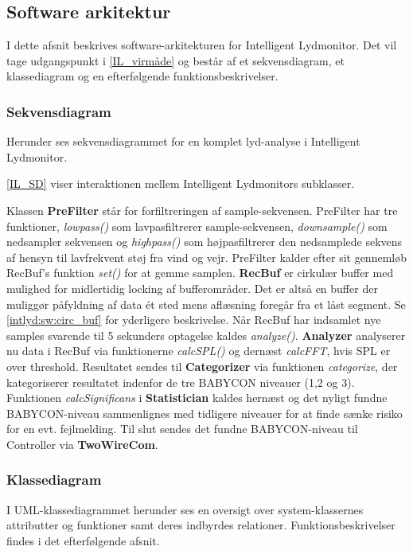 \newpage
\subsection{Software arkitektur}
I dette afsnit beskrives software-arkitekturen for Intelligent Lydmonitor. Det vil tage udgangspunkt i \ref{IL_virmåde} og består af et sekvensdiagram, et klassediagram og en efterfølgende funktionsbeskrivelser.

\subsubsection*{Sekvensdiagram}
Herunder ses sekvensdiagrammet for en komplet lyd-analyse i Intelligent Lydmonitor.

\ref{IL_SD} viser interaktionen mellem Intelligent Lydmonitors subklasser.

Klassen \textbf{PreFilter} står for forfiltreringen af sample-sekvensen. PreFilter har tre funktioner, \textit{lowpass()} som lavpasfiltrerer sample-sekvensen, \textit{downsample()} som nedsampler sekvensen og \textit{highpass()} som højpasfiltrerer den nedsamplede sekvens af hensyn til lavfrekvent støj fra vind og vejr. PreFilter kalder efter sit gennemløb RecBuf's funktion \textit{set()} for at gemme samplen.
\textbf{RecBuf} er cirkulær buffer med mulighed for midlertidig locking af bufferområder. Det er altså en buffer der muliggør påfyldning af data ét sted mens aflæsning foregår fra et låst segment. Se \ref{intlyd:sw:circ_buf} for yderligere beskrivelse. Når RecBuf har indsamlet nye samples svarende til 5 sekunders optagelse kaldes \textit{analyze()}. \textbf{Analyzer} analyserer nu data i RecBuf via funktionerne \textit{calcSPL()} og dernæst \textit{calcFFT}, hvis SPL er over threshold. Resultatet sendes til \textbf{Categorizer} via funktionen \textit{categorize}, der kategoriserer resultatet indenfor de tre BABYCON niveauer (1,2 og 3). Funktionen \textit{calcSignificans} i \textbf{Statistician} kaldes hernæst og det nyligt fundne BABYCON-niveau sammenlignes med tidligere niveauer for at finde sænke risiko for en evt. fejlmelding. Til slut sendes det fundne BABYCON-niveau til Controller via \textbf{TwoWireCom}. 

\subsubsection*{Klassediagram}
I UML-klassediagrammet herunder ses en oversigt over system-klassernes attributter og funktioner samt deres indbyrdes relationer. 
Funktionsbeskrivelser findes i det efterfølgende afsnit. 

